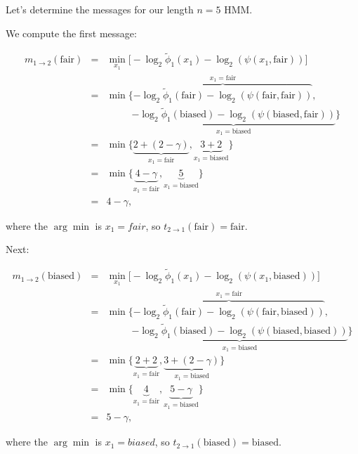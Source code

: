 \documentclass[6008notes.tex]{subfiles}
\begin{document}
Let's determine the messages for our length $n=5$ HMM.

We compute the first message:

\begin{eqnarray*}
m_{1\rightarrow 2}(\text{fair})
&=& \min_{x_1}
      \big[ -\log_2\widetilde\phi_1(x_1) - \log_2(\psi(x_1, \text{fair})) \big] \\
&=& \min
      \big\{
        \overbrace{-\log_2\widetilde\phi_1(\text{fair})
          - \log_2(\psi(\text{fair}, \text{fair}))}^{x_1 = \text{fair}}, \\
&&\qquad\;\;
        \underbrace{-\log_2\widetilde\phi_1(\text{biased})
          - \log_2(\psi(\text{biased}, \text{fair}))}_{x_1 = \text{biased}}
      \big\} \\
&=& \min
      \big\{
        \underbrace{2 + (2 - \gamma)}_{x_1 = \text{fair}},
        \underbrace{3 + 2}_{x_1 = \text{biased}}
      \big\} \\
&=& \min
      \big\{
        \underbrace{4 - \gamma}_{x_1 = \text{fair}},
        \underbrace{5}_{x_1 = \text{biased}}
      \big\} \\
&=& 4 - \gamma,
\end{eqnarray*}

where the $\arg \min$ is $x_1=fair$, so $t_{2\rightarrow 1}(\text {fair}) = \text {fair}$.

Next:

\begin{eqnarray*}
m_{1\rightarrow 2}(\text{biased})
&=& \min_{x_1}
      \big[ -\log_2\widetilde\phi_1(x_1) - \log_2(\psi(x_1, \text{biased})) \big] \\
&=& \min
      \big\{
        \overbrace{-\log_2\widetilde\phi_1(\text{fair})
          - \log_2(\psi(\text{fair}, \text{biased}))}^{x_1 = \text{fair}}, \\
&&\qquad\;\;
        \underbrace{-\log_2\widetilde\phi_1(\text{biased})
          - \log_2(\psi(\text{biased}, \text{biased}))}_{x_1 = \text{biased}}
      \big\} \\
&=& \min
      \big\{
        \underbrace{2 + 2}_{x_1 = \text{fair}},
        \underbrace{3 + (2 - \gamma)}_{x_1 = \text{biased}}
      \big\} \\
&=& \min
      \big\{
        \underbrace{4}_{x_1 = \text{fair}},
        \underbrace{5 - \gamma}_{x_1 = \text{biased}}
      \big\} \\
&=& 5 - \gamma,
\end{eqnarray*}

where the $\arg \min$ is $x_1=biased$, so $t_{2\rightarrow 1}(\text {biased}) = \text {biased}$.
\end{document}
